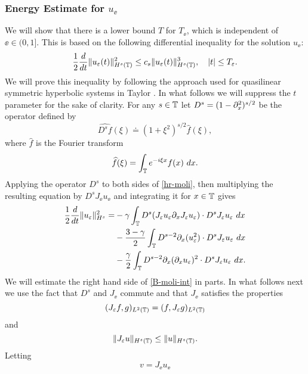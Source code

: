 \subsubsection{Energy Estimate for $u_\ee$}
%
We will show that there is a lower bound  $T$
for $T_\ee$, which is  independent of $\ee\in(0, 1]$.
This is based on the following differential
inequality for the solution $u_\ee$:
%
\begin{equation} 
\label{B-diff-ineq}
\frac 12
\frac{d}{dt}
\|u_\varepsilon(t)\|_{H^{s}(\mathbb{T})}^2
\le
c_s
\|u_\varepsilon(t)\|_{H^{s}(\mathbb{T})}^3,
\quad
|t| \le T_\varepsilon.
\end{equation}
%
%
We will prove this inequality  by
following the approach used for quasilinear symmetric
hyperbolic systems in Taylor \cite{Taylor:1991}. In what follows we will suppress the
$t$ parameter for the sake of clarity.
%
For any $s\in \mathbb{T}$ let   $D^s=(1-\partial_x^2)^{s/2}$ be the  operator
defined by 
%
$$ \widehat{D^s f}(\xi) \doteq (1 + \xi^2)^{s/2} \widehat{f}(\xi), $$
%
where $ \widehat{f}$ is the Fourier transform
%
$$ \widehat{f}(\xi) =  \int_{\mathbb{T}} e^{-i \xi x} f(x) \ dx.  $$
%
Applying the operator $D^s$ to  both sides of  \eqref{hr-moli},
then  multiplying the resulting equation by $D^s J_\ee u_\ee$
and integrating it for $x\in\mathbb{T}$ gives
%
\begin{equation} 
\begin{split}
\label{B-moli-int}
\frac 12
\frac{d}{dt} \|u_\varepsilon \|_{H^s}^2
=
&-
\gamma \int_{\mathbb{T}}  D^s(J_\varepsilon u_\varepsilon \partial_x J_\varepsilon u_\varepsilon) \cdot
D^s J_\varepsilon u_\varepsilon  \  dx
\\
&- \frac{3 -\gamma}{2} \int_{\mathbb{T}} D^{s-2} \partial_x (u_{\varepsilon}^2) 
\cdot D^s J_\varepsilon u_{\varepsilon} \ dx
\\
&- \frac{\gamma}{2} \int_{\mathbb{T}}  D^{s-2} \partial_x (\partial_x u_\varepsilon)^2
\cdot D^s J_\varepsilon u_\varepsilon  \ dx.
\end{split}
\end{equation}
%
We will estimate the right hand side of \eqref{B-moli-int} in parts. In
what follows next we use the fact that  $D^s$ and $J_\ee$ commute and
that  $J_\ee$ satisfies the properties 
%
\begin{equation} 
\label{J-e-inner-prod-property}
(J_\varepsilon f, g)_{L^2(\mathbb{T})}=( f, J_\varepsilon g)_{L^2(\mathbb{T})}
\end{equation}
%
and
%
\begin{equation} 
\label{Je-u-Hs}
\| J_\varepsilon u \|_{H^s(\mathbb{T})}
\le
\|  u \|_{H^s(\mathbb{T})}.
\end{equation}
%
%
%
%
\noindent
Letting 
%
\begin{equation} 
\label{v-Je-ue}
v=J_\ee u_\ee
\end{equation}
